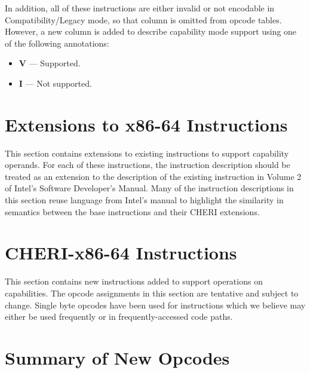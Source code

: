 In addition, all of these instructions are either invalid or not
encodable in Compatibility/Legacy mode, so that column is omitted from
opcode tables.  However, a new column is added to describe capability
mode support using one of the following annotations:

\begin{itemize}
  \item \textbf{V} { }---{ } Supported.
  \item \textbf{I} { }---{ } Not supported.
\end{itemize}

\clearpage
\section{Extensions to x86-64 Instructions}

This section contains extensions to existing instructions to support
capability operands.  For each of these instructions, the instruction
description should be treated as an extension to the description of
the existing instruction in Volume 2 of Intel's Software Developer's
Manual.  Many of the instruction descriptions in this section reuse
language from Intel's manual to highlight the similarity in semantics
between the base instructions and their CHERI extensions.










\clearpage
\section{CHERI-x86-64 Instructions}

This section contains new instructions added to support operations on
capabilities.  The opcode assignments in this section are tentative
and subject to change.  Single byte opcodes have been used for
instructions which we believe may either be used frequently or in
frequently-accessed code paths.






\clearpage
\section{Summary of New Opcodes}

